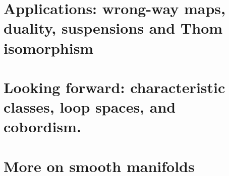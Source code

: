 \documentclass{amsart}          %
\begin{document}
\section{Applications: wrong-way maps, duality, suspensions and Thom isomorphism}

\section{Looking forward: characteristic classes, loop spaces, and cobordism.}


\appendix
\section{More on smooth manifolds}
\end{document}
